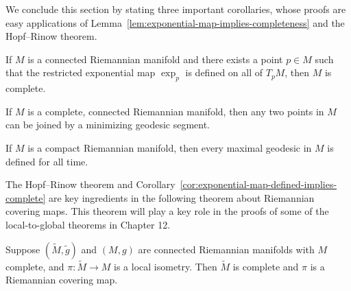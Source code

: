 We conclude this section by stating three important corollaries, whose proofs are easy applications of Lemma~\ref{lem:exponential-map-implies-completeness} and the Hopf--Rinow theorem.

\begin{corollary}
\label{cor:exponential-map-defined-implies-complete}

If $M$ is a connected Riemannian manifold and there exists a point $p \in M$ such that the restricted exponential map $\exp_p$ is defined on all of $T_p M$, then $M$ is complete.
\end{corollary}

\begin{corollary}
\label{cor:complete-implies-minimizing-geodesics}

If $M$ is a complete, connected Riemannian manifold, then any two points in $M$ can be joined by a minimizing geodesic segment.
\end{corollary}

\begin{corollary}
\label{cor:compact-implies-maximal-geodesics-defined}

If $M$ is a compact Riemannian manifold, then every maximal geodesic in $M$ is defined for all time.
\end{corollary}

The Hopf--Rinow theorem and Corollary~\ref{cor:exponential-map-defined-implies-complete} are key ingredients in the following theorem about Riemannian covering maps. This theorem will play a key role in the proofs of some of the local-to-global theorems in Chapter 12.


\begin{theorem}
\label{thm:completeness-of-covering-map}

Suppose $(\tilde{M}, \tilde{g})$ and $(M, g)$ are connected Riemannian manifolds with $M$ complete, and $\pi: \tilde{M} \to M$ is a local isometry. Then $\tilde{M}$ is complete and $\pi$ is a Riemannian covering map.
\end{theorem}

